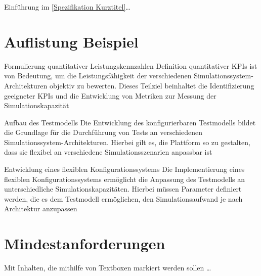 
Einführung im \autoref{Spezifikation Kurztitel}\ldots

\section{Auflistung Beispiel}

\begin{Itemize}
  \item Formulierung quantitativer Leistungskennzahlen
  \newline
  Definition quantitativer KPIs ist von Bedeutung, um die Leistungsfähigkeit der
  verschiedenen Simulationssystem-Architekturen objektiv zu bewerten. Dieses Teilziel
  beinhaltet die Identifizierung geeigneter KPIs und die Entwicklung von Metriken zur Messung
  der Simulationskapazität
  \item Aufbau des Testmodells
  \newline
  Die Entwicklung des konfigurierbaren Testmodells bildet die Grundlage für die Durchführung von
  Tests an verschiedenen Simulationssystem-Architekturen. Hierbei gilt es, die Plattform so zu gestalten,
  dass sie flexibel an verschiedene Simulationsszenarien anpassbar ist
  \item Entwicklung eines flexiblen Konfigurationssystems
  \newline
  Die Implementierung eines flexiblen Konfigurationssystems ermöglicht die Anpassung des Testmodells an
  unterschiedliche Simulationskapazitäten. Hierbei müssen Parameter definiert werden, die es dem Testmodell
  ermöglichen, den Simulationsaufwand je nach Architektur anzupassen
\end{Itemize}

\section{Mindestanforderungen}

Mit Inhalten, die mithilfe von Textboxen \colorbox{yellowdark}{markiert} werden sollen \ldots

